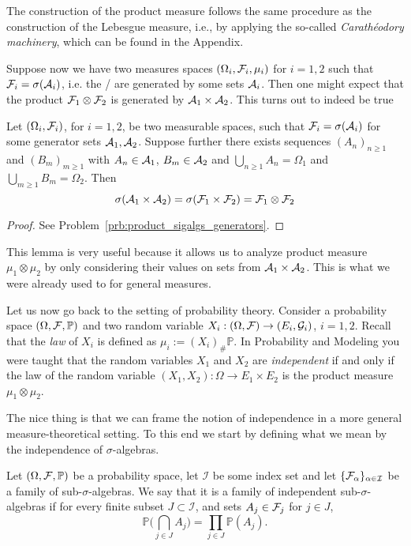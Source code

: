 The construction of the product measure follows the same procedure as the construction of the Lebesgue measure, i.e., by applying the so-called \emph{Carath\'eodory machinery}, which can be found in the Appendix.

Suppose now we have two measures spaces $(\Omega_i, \mathcal F_i, \mu_i)$ for $i = 1,2$ such that $\mathcal F_i = \sigma(\mathcal A_i)$, i.e. the \sigalgs/ are generated by some sets $\mathcal A_i$. Then one might expect that the product $\mathcal F_1 \otimes \mathcal F_2$ is generated by $\mathcal A_1 \times \mathcal A_2$. This turns out to indeed be true

\begin{lemma}\label{lem:product_sigalgs_generators}
Let $(\Omega_i, \mathcal F_i)$, for $i = 1, 2$,  be two measurable spaces, such that $\mathcal F_i = \sigma(\mathcal A_i)$ for some generator sets $\mathcal A_1, \mathcal A_2$. Suppose further there exists sequences $(A_n)_{n \ge 1}$ and $(B_m)_{m \ge 1}$ with $A_n \in \mathcal A_1$, $B_m \in \mathcal A_2$ and $\bigcup_{n \ge 1} A_n = \Omega_1$ and $\bigcup_{m \ge 1} B_m = \Omega_2$. Then
\[
	\sigma(\mathcal A_1 \times \mathcal A_2) = \sigma(\mathcal F_1 \times \mathcal F_2) = \mathcal F_1 \otimes \mathcal F_2
\] 
\end{lemma}

\begin{proof}
See Problem~\ref{prb:product_sigalgs_generators}.
\end{proof}

This lemma is very useful because it allows us to analyze product measure $\mu_1 \otimes \mu_2$ by only considering their values on sets from $\mathcal A_1 \times \mathcal A_2$. This is what we were already used to for general measures.

\medskip

Let us now go back to the setting of probability theory. Consider a probability space $(\Omega, \mathcal F, \mathbb{P})$ and two random variable $X_i: (\Omega, \mathcal F) \to (E_i, \mathcal{G}_i)$, $i=1,2$. Recall that the \emph{law} of $X_i$ is defined as $\mu_i:= (X_i)_\# \mathbb{P}$. In Probability and Modeling you were taught that the random variables $X_1$ and $X_2$ are \emph{independent} if and only if the law of the random variable $(X_1, X_2): \Omega \to E_1\times E_2$ is the product measure $\mu_1 \otimes \mu_2$.

The nice thing is that we can frame the notion of independence in a more general measure-theoretical setting. To this end we start by defining what we mean by the independence of $\sigma$-algebras.

\begin{definition}
	Let $(\Omega, \mathcal F, \mathbb{P})$ be a probability space, let $\mathcal{I}$ be some index set and let $\{\mathcal F_\alpha\}_{\alpha \in \mathcal{I}}$ be a family of sub-$\sigma$-algebras. We say that it is a family of independent sub-$\sigma$-algebras if for every finite subset $J \subset \mathcal{I}$, and sets $A_j\in \mathcal F_j$ for $j \in J$,
	\[
	\mathbb{P}\biggl( \bigcap_{j \in J} A_j \biggr) = \prod_{j \in J} \mathbb{P}(A_{j}).
	\]
\end{definition}

